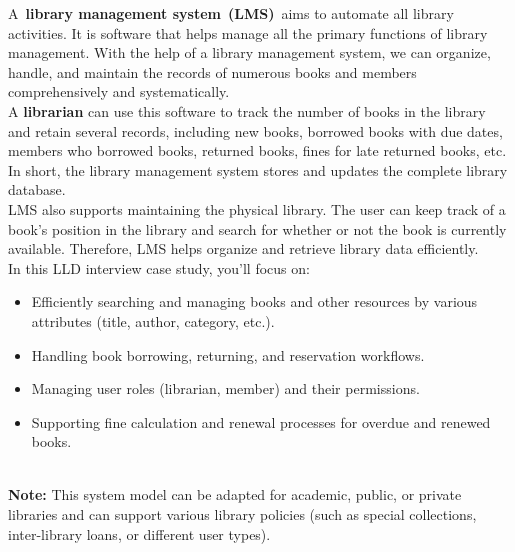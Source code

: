 

A~\textbf{library management system}~\textbf{(LMS)}~aims to automate all library activities. It is software that helps manage all the primary functions of library management. With the help of a library management system, we can organize, handle, and maintain the records of numerous books and members comprehensively and systematically.
\\
A \textbf{librarian} can use this software to track the number of books in the library and retain several records, including new books, borrowed books with due dates, members who borrowed books, returned books, fines for late returned books, etc. In short, the library management system stores and updates the complete library database.
\\
LMS also supports maintaining the physical library. The user can keep track of a book's position in the library and search for whether or not the book is currently available. Therefore, LMS helps organize and retrieve library data efficiently.
\\
In this LLD interview case study, you'll focus on:

\begin{itemize}
\item
\protect{}\label{3rIwNZR0yJhHLtDjBGnVe}
Efficiently searching and managing books and other resources by various attributes (title, author, category, etc.).
\item
\protect{}\label{76bX_ZRBKUVtwu64Bpd84}
Handling book borrowing, returning, and reservation workflows.
\item
\protect{}\label{eo0GltmAG_6hGJ6XPJWxF}
Managing user roles (librarian, member) and their permissions.
\item
\protect{}\label{BAY2-PQyukd23kGWWZ7BM}
Supporting fine calculation and renewal processes for overdue and renewed books.
\end{itemize}
\\
\textbf{Note:} This system model can be adapted for academic, public, or private libraries and can support various library policies (such as special collections, inter-library loans, or different user types).

